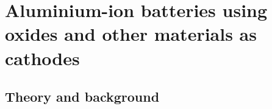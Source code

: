 
\chapter{Aluminium-ion batteries using oxides and other materials as cathodes} %

\label{Chapter6} %


\newcommand{\keyword}[1]{\textbf{#1}}
\newcommand{\tabhead}[1]{\textbf{#1}}
\newcommand{\code}[1]{\texttt{#1}}
\newcommand{\file}[1]{\texttt{\bfseries#1}}
\newcommand{\option}[1]{\texttt{\itshape#1}}

\section{Theory and background}
